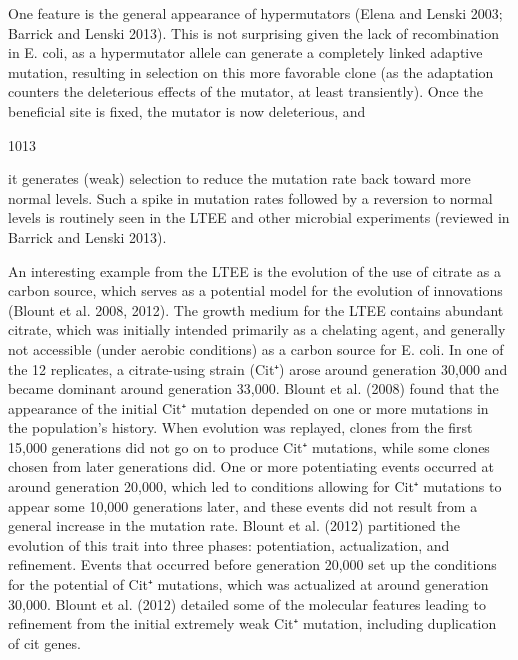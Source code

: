 \documentclass{article}
\begin{document}
One feature is the general appearance of hypermutators (Elena and Lenski 2003; Barrick and Lenski 2013). This is not surprising given the lack of recombination in E. coli, as a hypermutator allele can generate a completely linked adaptive mutation, resulting in selection on this more favorable clone (as the adaptation counters the deleterious effects of the mutator, at least transiently). Once the beneficial site is fixed, the mutator is now deleterious, and

1013

it generates (weak) selection to reduce the mutation rate back toward more normal levels. Such a spike in mutation rates followed by a reversion to normal levels is routinely seen in the LTEE and other microbial experiments (reviewed in Barrick and Lenski 2013).

An interesting example from the LTEE is the evolution of the use of citrate as a carbon source, which serves as a potential model for the evolution of innovations (Blount et al. 2008, 2012). The growth medium for the LTEE contains abundant citrate, which was initially intended primarily as a chelating agent, and generally not accessible (under aerobic conditions) as a carbon source for E. coli. In one of the 12 replicates, a citrate-using strain (Cit⁺) arose around generation 30,000 and became dominant around generation 33,000. Blount et al. (2008) found that the appearance of the initial Cit⁺ mutation depended on one or more mutations in the population's history. When evolution was replayed, clones from the first 15,000 generations did not go on to produce Cit⁺ mutations, while some clones chosen from later generations did. One or more potentiating events occurred at around generation 20,000, which led to conditions allowing for Cit⁺ mutations to appear some 10,000 generations later, and these events did not result from a general increase in the mutation rate. Blount et al. (2012) partitioned the evolution of this trait into three phases: potentiation, actualization, and refinement. Events that occurred before generation 20,000 set up the conditions for the potential of Cit⁺ mutations, which was actualized at around generation 30,000. Blount et al. (2012) detailed some of the molecular features leading to refinement from the initial extremely weak Cit⁺ mutation, including duplication of cit genes.
\end{document}
